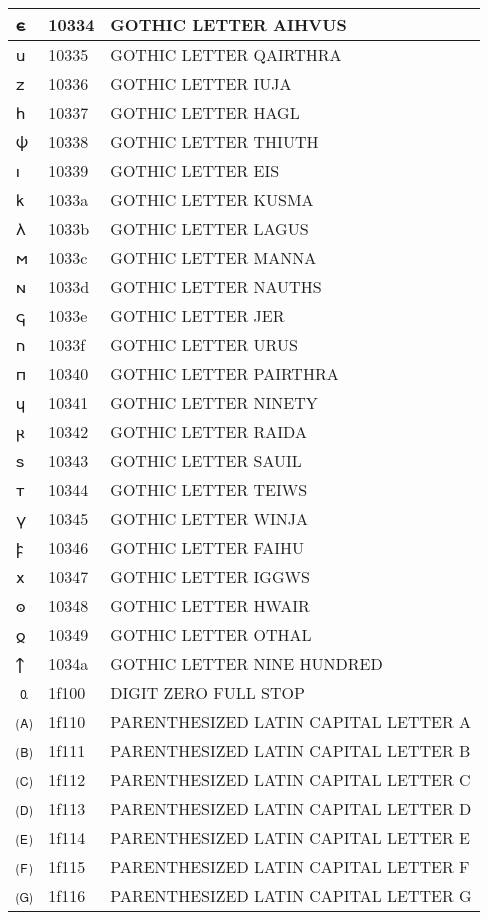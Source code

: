 \documentclass[12pt,letterpaper,openany]{book}
\begin{document}
\begin{center}
\begin{supertabular}{|m{0.25in}|m{0.5in}|m{4in}|}
𐌴 & 10334 & GOTHIC LETTER AIHVUS\\\hline
𐌵 & 10335 & GOTHIC LETTER QAIRTHRA\\\hline
𐌶 & 10336 & GOTHIC LETTER IUJA\\\hline
𐌷 & 10337 & GOTHIC LETTER HAGL\\\hline
𐌸 & 10338 & GOTHIC LETTER THIUTH\\\hline
𐌹 & 10339 & GOTHIC LETTER EIS\\\hline
𐌺 & 1033a & GOTHIC LETTER KUSMA\\\hline
𐌻 & 1033b & GOTHIC LETTER LAGUS\\\hline
𐌼 & 1033c & GOTHIC LETTER MANNA\\\hline
𐌽 & 1033d & GOTHIC LETTER NAUTHS\\\hline
𐌾 & 1033e & GOTHIC LETTER JER\\\hline
𐌿 & 1033f & GOTHIC LETTER URUS\\\hline
𐍀 & 10340 & GOTHIC LETTER PAIRTHRA\\\hline
𐍁 & 10341 & GOTHIC LETTER NINETY\\\hline
𐍂 & 10342 & GOTHIC LETTER RAIDA\\\hline
𐍃 & 10343 & GOTHIC LETTER SAUIL\\\hline
𐍄 & 10344 & GOTHIC LETTER TEIWS\\\hline
𐍅 & 10345 & GOTHIC LETTER WINJA\\\hline
𐍆 & 10346 & GOTHIC LETTER FAIHU\\\hline
𐍇 & 10347 & GOTHIC LETTER IGGWS\\\hline
𐍈 & 10348 & GOTHIC LETTER HWAIR\\\hline
𐍉 & 10349 & GOTHIC LETTER OTHAL\\\hline
𐍊 & 1034a & GOTHIC LETTER NINE HUNDRED\\\hline
🄀 & 1f100 & DIGIT ZERO FULL STOP\\\hline
🄐 & 1f110 & PARENTHESIZED LATIN CAPITAL LETTER A\\\hline
🄑 & 1f111 & PARENTHESIZED LATIN CAPITAL LETTER B\\\hline
🄒 & 1f112 & PARENTHESIZED LATIN CAPITAL LETTER C\\\hline
🄓 & 1f113 & PARENTHESIZED LATIN CAPITAL LETTER D\\\hline
🄔 & 1f114 & PARENTHESIZED LATIN CAPITAL LETTER E\\\hline
🄕 & 1f115 & PARENTHESIZED LATIN CAPITAL LETTER F\\\hline
🄖 & 1f116 & PARENTHESIZED LATIN CAPITAL LETTER G\\\hline

\end{supertabular}
\end{center}
\end{document}
